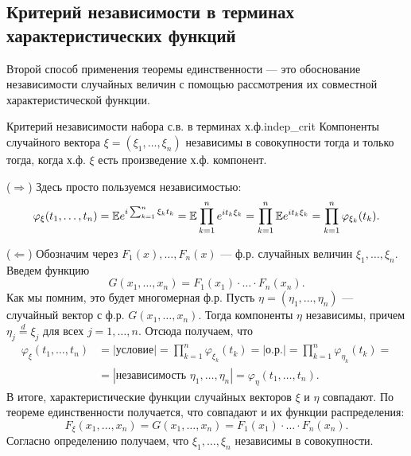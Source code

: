 \subsection{Критерий независимости в терминах характеристических функций}

Второй способ применения теоремы единственности --- это обоснование независимости случайных величин с помощью рассмотрения их совместной характеристической функции.

\begin{theorem}{Критерий независимости набора с.в. в терминах х.ф.}{indep_crit}
    Компоненты случайного вектора $\xi = (\xi_1, \dots, \xi_n)$ независимы в совокупности тогда и только тогда, когда х.ф. $\xi$ есть произведение х.ф. компонент.
\end{theorem}
\begin{proofbox}
    ($\Rightarrow$) Здесь просто пользуемся независимостью:
    \begin{equation*}
        \varphi_{\xi}(t_1, \dots, t_n) = \mathbb{E} e^{i \sum_{k=1}^n \xi_k t_k} = \mathbb{E} \prod_{k=1}^n e^{i t_k \xi_k} = \prod_{k=1}^n \mathbb{E} e^{i t_k \xi_k} = \prod_{k=1}^n \varphi_{\xi_k}(t_k).
    \end{equation*}
    
    ($\Leftarrow$) Обозначим через $F_1(x), \dots, F_n(x)$ --- ф.р. случайных величин $\xi_1, \dots, \xi_n$. Введем функцию
    \begin{equation*}
        G(x_1, \dots, x_n) = F_1(x_1) \cdot \dots \cdot F_n(x_n).
    \end{equation*}
    Как мы помним, это будет многомерная ф.р. Пусть $\eta = (\eta_1, \dots, \eta_n)$ --- случайный вектор с ф.р. $G(x_1, \dots, x_n)$. Тогда компоненты $\eta$ независимы, причем $\eta_j \stackrel{d}{=} \xi_j$ для всех $j = 1, \dots, n$. Отсюда получаем, что
    \begin{align*}
        \varphi_{\xi}(t_1, \dots, t_n) &= |\text{условие}| = \prod_{k=1}^n \varphi_{\xi_k}(t_k) = |\text{о.р.}| = \prod_{k=1}^n \varphi_{\eta_k}(t_k) = \\
        &= |\text{независимость } \eta_1, \dots, \eta_n| = \varphi_{\eta}(t_1, \dots, t_n).
    \end{align*}
    В итоге, характеристические функции случайных векторов $\xi$ и $\eta$ совпадают. По теореме единственности получается, что совпадают и их функции распределения:
    \begin{equation*}
        F_{\xi}(x_1, \dots, x_n) = G(x_1, \dots, x_n) = F_1(x_1) \cdot \dots \cdot F_n(x_n).
    \end{equation*}
    Согласно определению получаем, что $\xi_1, \dots, \xi_n$ независимы в совокупности.
\end{proofbox}

